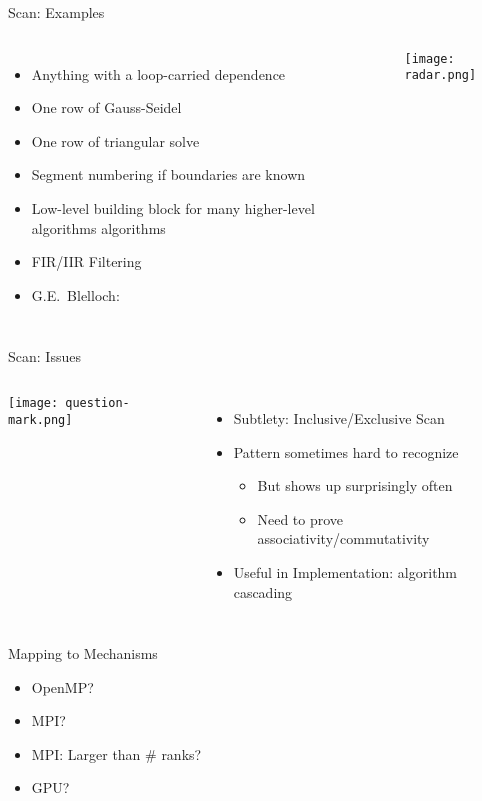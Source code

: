 \documentclass[english,compress]{beamer}
\begin{document}
\begin{frame}{Scan: Examples}
  \begin{columns}
      \begin{itemize}
        \item Anything with a loop-carried dependence
        \item One row of Gauss-Seidel
        \item One row of triangular solve
        \item Segment numbering if boundaries are known
        \item Low-level building block for many higher-level algorithms
        algorithms
        \item FIR/IIR Filtering
        \item G.E.~Blelloch:
      \end{itemize}

      \texttt{[image: radar.png]}
  \end{columns}
\end{frame}
\begin{frame}{Scan: Issues}
  \begin{columns}
      \texttt{[image: question-mark.png]}
      \begin{itemize}
        \item Subtlety: Inclusive/Exclusive Scan
        \item Pattern sometimes hard to recognize
          \begin{itemize}
            \item But shows up surprisingly often
            \item Need to prove associativity/commutativity
          \end{itemize}
        \item Useful in Implementation: algorithm cascading
      \end{itemize}
  \end{columns}
\end{frame}
\begin{frame}{Mapping to Mechanisms}
  \begin{itemize}[<+->]
    \item OpenMP?
    \item MPI?
    \item MPI: Larger than \# ranks?
    \item GPU?
  \end{itemize}
\end{frame}
\end{document}
